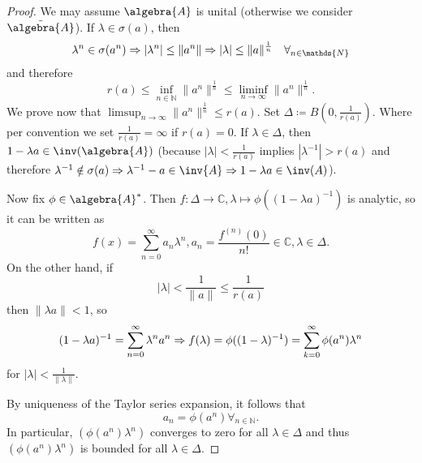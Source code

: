 \documentclass[a4paper]{article}
\begin{document}
\begin{proof}
	We may assume $\algebra{A}$ is unital (otherwise we consider $\tilde{\algebra{A}}$). If $\lambda \in \sigma(a)$, then
	\begin{equation*}
		\lambda^n \in \sigma(a^n) \then |\lambda^n| \leq \| a^n \| \then |\lambda| \leq \|a\|^{\frac{1}{n}} \quad \forall_{n \in \mathds{N}}
	\end{equation*}
	and therefore
	\begin{equation*}
		r(a) \leq \inf_{n \in \mathds{N}} \|a^n\|^{\frac{1}{n}} \leq \liminf_{n \to \infty} \|a^n\|^{\frac{1}{n}}\text{.}
	\end{equation*}
	We prove now that $\limsup_{n \to \infty} \|a^n\|^{\frac{1}{n}} \leq r(a)$. Set $\Delta \coloneq B\left(0, \frac{1}{r(a)}\right)$. Where per convention we set $\frac{1}{r(a)} = \infty$ if $r(a) = 0$. If $\lambda \in \Delta$, then $1 - \lambda a \in \inv(\algebra{A})$ (because $|\lambda| < \frac{1}{r(a)}$ implies $|\lambda^{-1}| > r(a)$ and therefore $\lambda^{-1} \notin \sigma(a) \then \lambda^{-1} - a \in \inv{A} \then 1 - \lambda a \in \inv(A)$).

	Now fix $\phi \in \algebra{A}^*$. Then $f: \Delta \to \mathds{C}, \lambda \mapsto \phi((1 - \lambda a)^{-1})$ is analytic, so it can be written as
	\begin{equation*}
		f(x) = \sum_{n = 0}^{\infty} a_n \lambda^n, a_n = \frac{f^{(n)}(0)}{n!} \in \mathds{C}, \lambda \in \Delta\text{.}
	\end{equation*}
	On the other hand, if
	\begin{equation*}
		|\lambda| < \frac{1}{\|a\|} \leq \frac{1}{r(a)}
	\end{equation*}
	then $\|\lambda a \| < 1$, so
	\begin{equation*}
		(1 - \lambda a)^{-1} = \sum_{n = 0}^{\infty} \lambda^n a^n \then f(\lambda) = \phi((1 - \lambda)^{-1}) = \sum_{k = 0}^{\infty} \phi(a^n) \lambda^n
	\end{equation*}
	for $|\lambda| < \frac{1}{\|\lambda\|}$.

	By uniqueness of the Taylor series expansion, it follows that
	\begin{equation*}
		a_n = \phi(a^n)	 \forall_{n \in \mathds{N}}\text{.}
	\end{equation*}
	In particular, $(\phi(a^n) \lambda^n)$ converges to zero for all $\lambda \in \Delta$ and thus $(\phi(a^n) \lambda^n)$ is bounded for all $\lambda \in \Delta$.


\end{proof}
\end{document}
